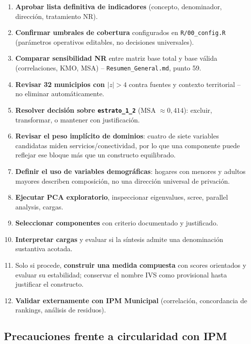 \begin{enumerate}
    \item \textbf{Aprobar lista definitiva de indicadores} (concepto, denominador, dirección, tratamiento NR).
    \item \textbf{Confirmar umbrales de cobertura} configurados en \texttt{R/00\_config.R} (parámetros operativos editables, no decisiones universales).
    \item \textbf{Comparar sensibilidad NR} entre matriz base total y base válida (correlaciones, KMO, MSA) -- \texttt{Resumen\_General.md}, punto 59.
    \item \textbf{Revisar 32 municipios con $|z|>4$} contra fuentes y contexto territorial -- no eliminar automáticamente.
    \item \textbf{Resolver decisión sobre \texttt{estrato\_1\_2}} (MSA $\approx 0,414$): excluir, transformar, o mantener con justificación.
    \item \textbf{Revisar el peso implícito de dominios}: cuatro de siete variables candidatas miden servicios/conectividad, por lo que una componente puede reflejar ese bloque más que un constructo equilibrado.
    \item \textbf{Definir el uso de variables demográficas}: hogares con menores y adultos mayores describen composición, no una dirección universal de privación.
    \item \textbf{Ejecutar PCA exploratorio}, inspeccionar eigenvalues, scree, parallel analysis, cargas.
    \item \textbf{Seleccionar componentes} con criterio documentado y justificado.
    \item \textbf{Interpretar cargas} y evaluar si la síntesis admite una denominación sustantiva acotada.
    \item Solo si procede, \textbf{construir una medida compuesta} con scores orientados y evaluar su estabilidad; conservar el nombre IVS como provisional hasta justificar el constructo.
    \item \textbf{Validar externamente con IPM Municipal} (correlación, concordancia de rankings, análisis de residuos).
\end{enumerate}

\subsection{Precauciones frente a circularidad con IPM}
\label{sec:precauciones_circularidad}

